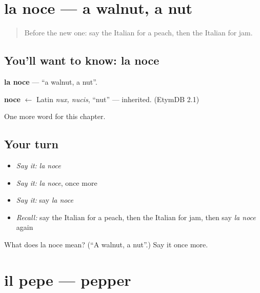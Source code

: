 \section[la noce]{la noce — a walnut, a nut}

\label{lesson:IT-C110-noce}



\begin{quote}
Before the new one: say the Italian for a peach, then the Italian for jam.
\end{quote}

\subsection*{You'll want to know: la noce}
\textbf{la noce} — \textquotedblleft{}a walnut, a nut\textquotedblright{}.

\begin{cousinweb}
\textbf{noce} $\leftarrow$ Latin \emph{nux, nucis}, \textquotedblleft{}nut\textquotedblright{} — inherited. (EtymDB 2.1)
\end{cousinweb}

\begin{grammarlens}[title={What you've built}]
One more word for this chapter.
\end{grammarlens}

\subsection*{Your turn}
\begin{itemize}
\raggedright
  \item \emph{Say it:} \emph{la noce}
  \item \emph{Say it:} \emph{la noce}, once more
  \item \emph{Say it:} say \emph{la noce}
  \item \emph{Recall:} say the Italian for a peach, then the Italian for jam, then say \emph{la noce} again
\end{itemize}

\begin{tcolorbox}[breakable,colback=teal!4,colframe=teal!35!black,title={Before you move on}]
What does la noce mean? (\textquotedblleft{}A walnut, a nut\textquotedblright{}.) Say it once more.
\end{tcolorbox}
\section[il pepe]{il pepe — pepper}

